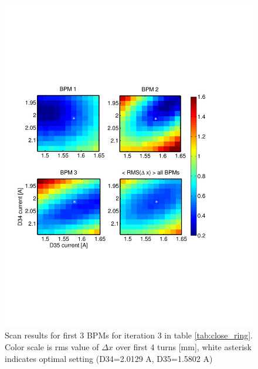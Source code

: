\begin{figure}[htb]
\centering
\includegraphics[width=\textwidth,trim={0 2.7in 1in 2.7in},clip]{3.figures/closing_orbit_iteration3.pdf}
\caption{Scan results for first 3 BPMs for iteration 3 in table \ref{tab:close_ring}. Color scale is rms value of $\Delta x$ over first 4 turns [mm], white asterisk indicates optimal setting (D34=2.0129 A, D35=1.5802 A) }
\label{fig:close_scan}
\end{figure}






